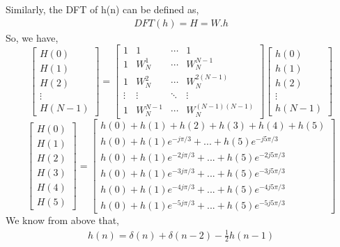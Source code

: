 \documentclass[journal,12pt,twocolumn]{IEEEtran}
\renewcommand\thesection{\arabic{section}}
\begin{document}
\begin{enumerate}[label=\thesection.\arabic*.,ref=\thesection.\theenumi]
\bigskip
Similarly, the DFT of h(n) can be defined as,
\begin{align}
    DFT(h)= H = W.h  \label{eq:dfth}
\end{align}
So, we have,
\begin{equation}
 \begin{bmatrix} H(0) \\ H(1) \\ H(2) \\ \vdots \\ H(N-1) \end{bmatrix}
=
\begin{bmatrix}
1 & 1 & \cdots & 1 \\
1 & W_N^1& \cdots & W_N^{N-1}\\
1 & W_N^2 &\cdots & W_N^{2(N-1)}\\
\vdots & \vdots & \ddots & \vdots\\
1 & W_N^{N-1} & \cdots &W_N^{(N-1)(N-1)}
\end{bmatrix}
\begin{bmatrix}
h(0) \\ h(1) \\ h(2) \\ \vdots \\ h(N-1)
\end{bmatrix}
\end{equation}
\begin{equation}
\begin{bmatrix} H(0) \\ H(1) \\ H(2) \\ H(3) \\ H(4) \\ H(5) \end{bmatrix}
=
\begin{bmatrix}
h(0) + h(1) + h(2) + h(3) + h(4) + h(5) \\h(0) + h(1)e^{-j\pi /3} + ... + h(5)e^{-j5\pi /3}\\h(0) + h(1)e^{-2j\pi /3} + ... + h(5)e^{-2j5\pi /3}\\h(0) + h(1)e^{-3j\pi /3} + ... + h(5)e^{-3j5\pi /3}\\
h(0) + h(1)e^{-4j\pi /3} + ... + h(5)e^{-4j5\pi /3}\\h(0) + h(1)e^{-5j\pi /3} + ... + h(5)e^{-5j5\pi /3}
\end{bmatrix}
\end{equation}
\bigskip
 We know from above that,
\begin{align}
     h(n) = \delta(n) + \delta(n-2) - \frac{1}{2}h(n-1) 

\end{align}
\end{enumerate}
\end{document}
